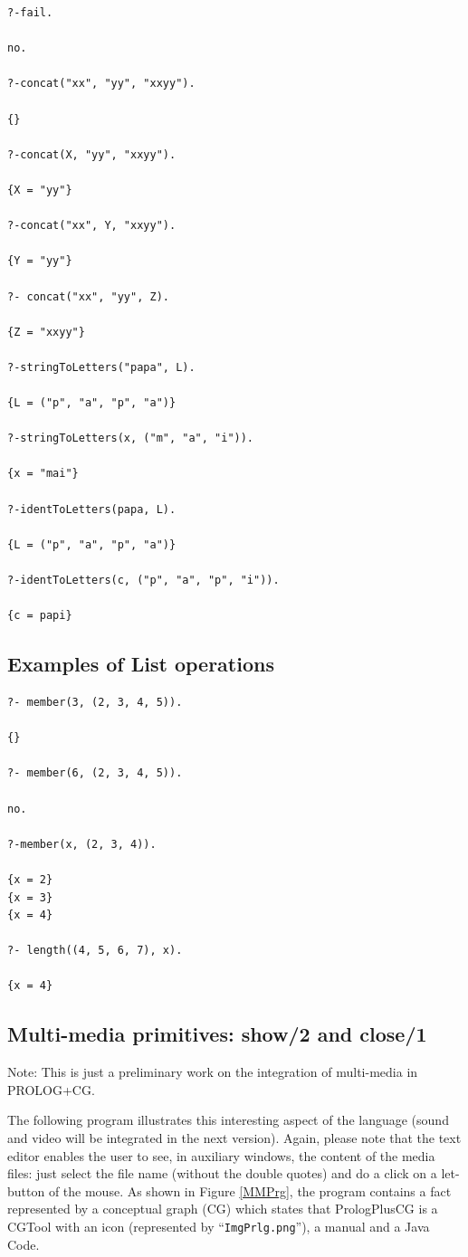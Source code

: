 \documentclass{book}
\begin{document}
\begin{verbatim}
?-fail.

no.

?-concat("xx", "yy", "xxyy").
  
{}

?-concat(X, "yy", "xxyy").
  
{X = "yy"}

?-concat("xx", Y, "xxyy").
  
{Y = "yy"}

?- concat("xx", "yy", Z).
  
{Z = "xxyy"}

?-stringToLetters("papa", L).

{L = ("p", "a", "p", "a")}

?-stringToLetters(x, ("m", "a", "i")).

{x = "mai"}

?-identToLetters(papa, L).

{L = ("p", "a", "p", "a")}

?-identToLetters(c, ("p", "a", "p", "i")).

{c = papi}

\end{verbatim}


\subsection{Examples of List operations}


\begin{verbatim}
?- member(3, (2, 3, 4, 5)).

{}

?- member(6, (2, 3, 4, 5)).

no.

?-member(x, (2, 3, 4)).

{x = 2}
{x = 3}
{x = 4}

?- length((4, 5, 6, 7), x).

{x = 4}

\end{verbatim}



\subsection{Multi-media primitives: show/2 and close/1}

Note: This is just a preliminary work on the integration of
multi-media in PROLOG+CG.

The following program illustrates this interesting aspect of the
language (sound and video will be integrated in the next version).
Again, please note that the text editor enables the user to see, in
auxiliary windows, the content of the media files: just select the
file name (without the double quotes) and do a click on a let-button
of the mouse. As shown in Figure \ref{MMPrg}, the program contains a
fact represented by a conceptual graph (CG) which states that
PrologPlusCG is a CGTool with an icon (represented by
``\texttt{ImgPrlg.png}''), a manual and a Java Code.
\end{document}
